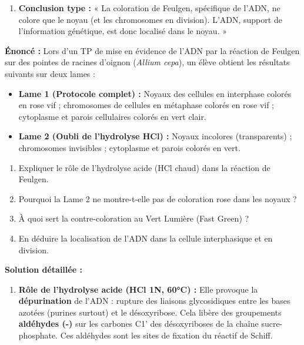 \documentclass[11pt]{article}
\begin{document}
\begin{methode}
\begin{enumerate}
\begin{itemize}
            \item \textbf{Mitose :} Chromosomes bichromatidiens roses alignés à l'équateur (métaphase).
        \end{itemize}
    \item \textbf{Conclusion type :} « La coloration de Feulgen, spécifique de l'ADN, ne colore que le noyau (et les chromosomes en division). L'ADN, support de l'information génétique, est donc localisé dans le noyau. »
\end{enumerate}
\end{methode}

\begin{exoresolu}
\textbf{Énoncé :} Lors d'un TP de mise en évidence de l'ADN par la réaction de Feulgen sur des pointes de racines d'oignon (\textit{Allium cepa}), un élève obtient les résultats suivants sur deux lames :
\begin{itemize}
    \item \textbf{Lame 1 (Protocole complet) :} Noyaux des cellules en interphase colorés en rose vif ; chromosomes de cellules en métaphase colorés en rose vif ; cytoplasme et parois cellulaires colorés en vert clair.
    \item \textbf{Lame 2 (Oubli de l'hydrolyse HCl) :} Noyaux incolores (transparents) ; chromosomes invisibles ; cytoplasme et parois colorés en vert.
\end{itemize}
\begin{enumerate}
    \item Expliquer le rôle de l'hydrolyse acide (HCl chaud) dans la réaction de Feulgen.
    \item Pourquoi la Lame 2 ne montre-t-elle pas de coloration rose dans les noyaux ?
    \item À quoi sert la contre-coloration au Vert Lumière (Fast Green) ?
    \item En déduire la localisation de l'ADN dans la cellule interphasique et en division.
\end{enumerate}
\tcblower
\textbf{Solution détaillée :}
\begin{enumerate}
    \item \textbf{Rôle de l'hydrolyse acide (HCl 1N, 60°C) :} Elle provoque la \textbf{dépurination} de l'ADN : rupture des liaisons glycosidiques entre les bases azotées (purines surtout) et le désoxyribose. Cela libère des groupements \textbf{aldéhydes (-)} sur les carbones C1' des désoxyriboses de la chaîne sucre-phosphate. Ces aldéhydes sont les sites de fixation du réactif de Schiff.

\end{enumerate}
\end{exoresolu}
\end{document}
